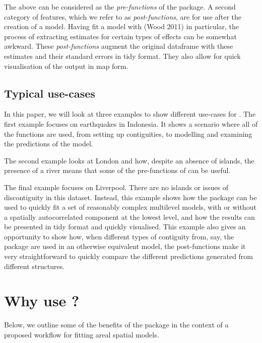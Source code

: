 The above can be considered as the \emph{pre-functions} of the package. A
second category of features, which we refer to as \emph{post-functions},
are for use after the creation of a model. Having fit a model with  (Wood 2011) in particular, the process of extracting estimates for certain types of effects can be somewhat awkward. These \emph{post-functions} augment the original dataframe with these estimates and their standard errors in tidy format. They also allow for quick visualisation of the output in map form.

\hypertarget{typical-use-cases}{%
\subsection{Typical use-cases}\label{typical-use-cases}}

In this paper, we will look at three examples to show different use-cases for
. The first example focuses on earthquakes in
Indonesia. It shows a scenario where all of the functions are used, from
setting up contiguities, to modelling and examining the predictions of the
model.

The second example looks at London and how, despite an absence of islands,
the presence of a river means that some of the pre-functions of
 can be useful.

The final example focuses on Liverpool. There are no islands or issues
of discontiguity in this dataset. Instead, this example shows how the package can be used to quickly fit a set of reasonably complex multilevel models, with or without a spatially autocorrelated component at the lowest level, and how the results can be presented in tidy format and quickly visualised. This example also gives an opportunity to show how, when different types of contiguity from, say, the  package are used in an otherwise equivalent model, the  post-functions make it very straightforward to quickly compare the different predictions generated from different structures.

\hypertarget{why-use}{%
\section{\texorpdfstring{Why use ?}{Why use ?}}\label{why-use}}

Below, we outline some of the benefits of the package in the context of a proposed workflow for fitting areal spatial models.

